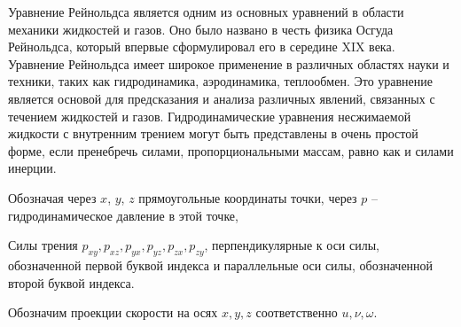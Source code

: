 \documentclass[a4paper,14pt]{extarticle}
\begin{document}
Уравнение Рейнольдса является одним из основных уравнений в области механики жидкостей и газов. Оно было названо в честь физика Осгуда Рейнольдса, который впервые сформулировал его в середине XIX века.
Уравнение Рейнольдса имеет широкое применение в различных областях науки и техники, таких как гидродинамика, аэродинамика, теплообмен. Это уравнение является основой для предсказания и анализа различных явлений, связанных с течением жидкостей и газов.
Гидродинамические уравнения несжимаемой жидкости с
внутренним трением могут быть представлены в очень простой
форме, если пренебречь силами, пропорциональными массам,
равно как и силами инерции.

Обозначая через $x$, $y$, $z$ прямоугольные координаты точки, через $p$ -- гидродинамическое давление в этой точке,

Силы трения $p_{xy}, p_{xz}, p_{yx}, p_{yz}, p_{zx}, p_{zy}$, перпендикулярные к оси силы, обозначенной первой буквой индекса и параллельные оси силы, обозначенной второй буквой индекса.

Обозначим проекции скорости на осях $x, y, z \text{ соответственно}$ $u, \nu, \omega$.
\end{document}
